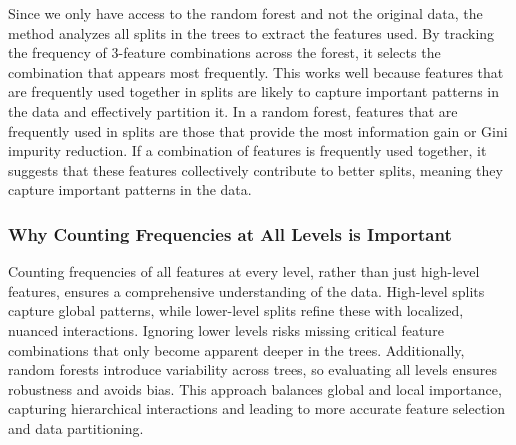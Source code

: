 \documentclass[fleqn,moreauthors,10pt]{ds_report}
\begin{document}
Since we only have access to the random forest and not the original data, the method analyzes all splits in the trees to extract the features used. By tracking the frequency of 3-feature combinations across the forest, it selects the combination that appears most frequently. This works well because features that are frequently used together in splits are likely to capture important patterns in the data and effectively partition it. In a random forest, features that are frequently used in splits are those that provide the most information gain or Gini impurity reduction. If a combination of features is frequently used together, it suggests that these features collectively contribute to better splits, meaning they capture important patterns in the data.


\subsubsection*{Why Counting Frequencies at All Levels is Important}

Counting frequencies of all features at every level, rather than just high-level features, ensures a comprehensive understanding of the data. High-level splits capture global patterns, while lower-level splits refine these with localized, nuanced interactions. Ignoring lower levels risks missing critical feature combinations that only become apparent deeper in the trees. Additionally, random forests introduce variability across trees, so evaluating all levels ensures robustness and avoids bias. This approach balances global and local importance, capturing hierarchical interactions and leading to more accurate feature selection and data partitioning.














\end{document}
